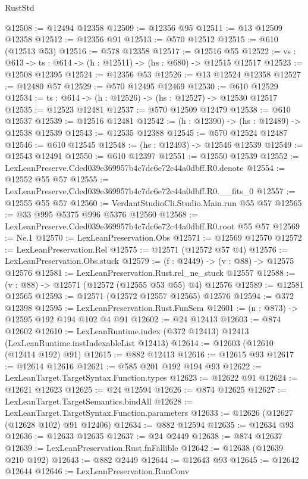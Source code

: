 \begin{lexlean}{RustStd}
\begin{coremodule}
@12508 := @12494 @12358
@12509 := @12356 @95
@12511 := @13 @12509 @12358
@12512 := @12356 @91
@12513 := @570 @12512
@12515 := @610 (@12513 @53)
@12516 := @578 @12358
@12517 := @12516 @55
@12522 := {vs : @613} -> {ts : @614} -> (h : @12511) -> (hs : @680) -> @12515 @12517
@12523 := @12508 @12395
@12524 := @12356 @53
@12526 := @13 @12524 @12358
@12527 := @12480 @57
@12529 := @570 @12495 @12469
@12530 := @610 @12529
@12534 := {ts : @614} -> (h : @12526) -> (hs : @12527) -> @12530 @12517
@12535 := @12523 @12481
@12537 := @570 @12509 @12479
@12538 := @610 @12537
@12539 := @12516 @12481
@12542 := (h : @12390) -> (hs : @12489) -> @12538 @12539
@12543 := @12535 @12388
@12545 := @570 @12524 @12487
@12546 := @610 @12545
@12548 := (hs : @12493) -> @12546 @12539
@12549 := @12543 @12491
@12550 := @610 @12397
@12551 := @12550 @12539
@12552 := LexLeanPreserve.Cded039e369957b4c7dc6e72c44a0dbff.R0.denote
@12554 := @12552 @55 @57
@12555 := LexLeanPreserve.Cded039e369957b4c7dc6e72c44a0dbff.R0.__fits_0
@12557 := @12555 @55 @57
@12560 := VerdantStudioCli.Studio.Main.run @55 @57
@12565 := @33 @995 @5375 @996 @5376 @12560
@12568 := LexLeanPreserve.Cded039e369957b4c7dc6e72c44a0dbff.R0.root @55 @57
@12569 := Ne.{1}
@12570 := LexLeanPreservation.Obs
@12571 := @12569 @12570
@12572 := LexLeanPreservation.Rel
@12575 := @12571 (@12572 @57 @4)
@12576 := LexLeanPreservation.Obs.stuck
@12579 := (f : @2449) -> (v : @88) -> @12575 @12576
@12581 := LexLeanPreservation.Rust.rel_ne_stuck @12557
@12588 := (v : @88) -> @12571 (@12572 (@12555 @53 @55) @4) @12576
@12589 := @12581 @12565
@12593 := @12571 (@12572 @12557 @12565) @12576
@12594 := @372 @12398
@12595 := LexLeanPreservation.Rust.FunSem
@12601 := (n : @873) -> @12595 @192 @194 @102 @4 @91
@12602 := @24 @12413
@12603 := @874 @12602
@12610 := LexLeanRuntime.index (@372 @12413) @12413 (LexLeanRuntime.instIndexableList @12413)
@12614 := @12603 (@12610 (@12414 @192) @91)
@12615 := @882 @12413
@12616 := @12615 @93
@12617 := @12614 @12616
@12621 := @585 @201 @192 @194 @93
@12622 := LexLeanTarget.TargetSyntax.Function.types
@12623 := @12622 @91
@12624 := @12621 @12623
@12625 := @24 @12594
@12626 := @874 @12625
@12627 := LexLeanTarget.TargetSemantics.bindAll
@12628 := LexLeanTarget.TargetSyntax.Function.parameters
@12633 := @12626 (@12627 (@12628 @102) @91 @12406)
@12634 := @882 @12594
@12635 := @12634 @93
@12636 := @12633 @12635
@12637 := @24 @2449
@12638 := @874 @12637
@12639 := LexLeanPreservation.Rust.fnFallible
@12642 := @12638 (@12639 @210 @192)
@12643 := @882 @2449
@12644 := @12643 @93
@12645 := @12642 @12644
@12646 := LexLeanPreservation.RunConv

\end{coremodule}
\end{lexlean}
